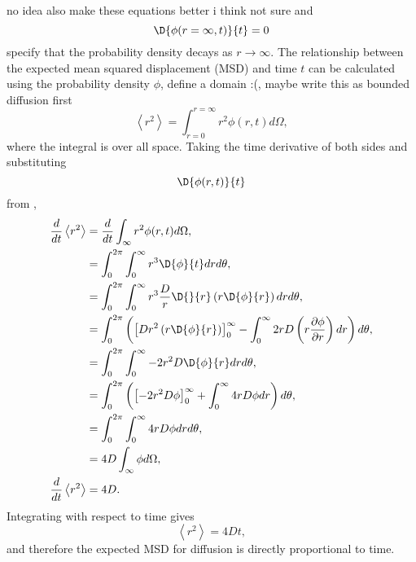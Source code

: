 {\huge no idea also make these equations better i think not sure}
%
%
and
%
\begin{equation}
\D{\phi(r=\infty,t)}{t} = 0
\end{equation}
%
specify that the probability density decays as $r\rightarrow\infty$.
The relationship between the expected mean squared displacement (MSD) and time $t$
can be calculated using the probability density $\phi$,
%
{\huge define a domain :(, maybe write this as bounded diffusion first}
\begin{equation}
\left<r^2\right> = \int_{r=0}^{r=\infty}r^2 \phi(r,t) d\Omega ,
\end{equation}
%
where the integral is over all space. Taking the time derivative of both
sides and substituting
\begin{equation}
    \D{\phi(r,t)}{ t}
\end{equation} from ,
%
\begin{equation}
\begin{split}
\frac{d}{dt} \left<r^2\right> &= \frac{d}{dt}\int_{\infty}r^2 \phi(r,t) d\Omega ,\\
                           &= \int_0^{2\pi} \int_0^{\infty} r^3 \D{\phi}{t} dr d\theta ,\\
                            &= \int_0^{2\pi} \int_0^{\infty} r^3 \frac{D}{r} \D{}{r } \left( r \D{ \phi}{ r}\right) dr d\theta , \\
                            &= \int_0^{2\pi} \left( \left[ D r^2 \left( r \D{ \phi}{ r}\right) \right]_0^{\infty} - \int_0^{\infty} 2rD \left(r \frac{\partial \phi}{\partial r} \right) dr \right) d\theta , \\
                            &= \int_0^{2\pi} \int_0^{\infty} -2r^2D \D{ \phi}{r}dr d\theta , \\
                            &= \int_0^{2\pi} \left( \left[-2r^2D \phi \right]_0^{\infty} + \int_0^{\infty} 4rD \phi dr \right)d\theta , \\
                            &= \int_0^{2\pi} \int_0^{\infty} 4rD\phi dr d\theta , \\
                            &= 4D \int_{\infty} \phi d\Omega , \\
\frac{d}{dt} \left<r^2\right>  &= 4D .\\
\label{eqn:diffusion_1}
\end{split}
\end{equation}
%
Integrating with respect to time gives
%
\begin{equation}
\left<r^2\right> = 4Dt ,
\label{eqn:diffusion_msd}
\end{equation}
and therefore the expected MSD for diffusion is directly proportional to time.


